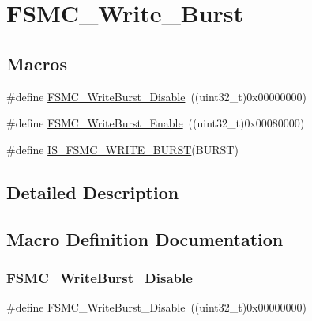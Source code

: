 \hypertarget{group___f_s_m_c___write___burst}{}\section{F\+S\+M\+C\+\_\+\+Write\+\_\+\+Burst}
\label{group___f_s_m_c___write___burst}
\subsection*{Macros}
\begin{DoxyCompactItemize}
\item 
\#define \mbox{\hyperlink{group___f_s_m_c___write___burst_ga65a49ecd05b3a128e8908c6a625adae7}{F\+S\+M\+C\+\_\+\+Write\+Burst\+\_\+\+Disable}}~((uint32\+\_\+t)0x00000000)
\item 
\#define \mbox{\hyperlink{group___f_s_m_c___write___burst_ga1b2b66a0eb42778c2cc9a05003cf7655}{F\+S\+M\+C\+\_\+\+Write\+Burst\+\_\+\+Enable}}~((uint32\+\_\+t)0x00080000)
\item 
\#define \mbox{\hyperlink{group___f_s_m_c___write___burst_gab7b03a33fab765827832abbf07d01a10}{I\+S\+\_\+\+F\+S\+M\+C\+\_\+\+W\+R\+I\+T\+E\+\_\+\+B\+U\+R\+ST}}(B\+U\+R\+ST)
\end{DoxyCompactItemize}


\subsection{Detailed Description}


\subsection{Macro Definition Documentation}
\mbox{\label{group___f_s_m_c___write___burst_ga65a49ecd05b3a128e8908c6a625adae7}} 
\subsubsection{\texorpdfstring{FSMC\_WriteBurst\_Disable}{FSMC\_WriteBurst\_Disable}}
{\footnotesize\ttfamily \#define F\+S\+M\+C\+\_\+\+Write\+Burst\+\_\+\+Disable~((uint32\+\_\+t)0x00000000)}

\mbox{\label{group___f_s_m_c___write___burst_ga1b2b66a0eb42778c2cc9a05003cf7655}} 
